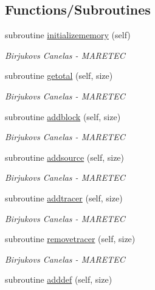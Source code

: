 \subsection*{Functions/\+Subroutines}
\begin{DoxyCompactItemize}
\item 
subroutine \hyperlink{namespacesimulation__memory__mod_ac8306165e4ec88fec9a2b8b719f61893}{initializememory} (self)
\begin{DoxyCompactList}\small\item\em Birjukovs Canelas -\/ M\+A\+R\+E\+T\+EC \end{DoxyCompactList}\item 
subroutine \hyperlink{namespacesimulation__memory__mod_acf04d6b930ed3ffbc0950afd86033c51}{getotal} (self, size)
\begin{DoxyCompactList}\small\item\em Birjukovs Canelas -\/ M\+A\+R\+E\+T\+EC \end{DoxyCompactList}\item 
subroutine \hyperlink{namespacesimulation__memory__mod_a4169689db37b3ba35e092096a7019f80}{addblock} (self, size)
\begin{DoxyCompactList}\small\item\em Birjukovs Canelas -\/ M\+A\+R\+E\+T\+EC \end{DoxyCompactList}\item 
subroutine \hyperlink{namespacesimulation__memory__mod_a940ff42fa3a49423f9ac98da2bffa54c}{addsource} (self, size)
\begin{DoxyCompactList}\small\item\em Birjukovs Canelas -\/ M\+A\+R\+E\+T\+EC \end{DoxyCompactList}\item 
subroutine \hyperlink{namespacesimulation__memory__mod_a5770021491589bbd61ea112d113a9c9d}{addtracer} (self, size)
\begin{DoxyCompactList}\small\item\em Birjukovs Canelas -\/ M\+A\+R\+E\+T\+EC \end{DoxyCompactList}\item 
subroutine \hyperlink{namespacesimulation__memory__mod_a5f95539e9740401e7046b79c40ad2ecd}{removetracer} (self, size)
\begin{DoxyCompactList}\small\item\em Birjukovs Canelas -\/ M\+A\+R\+E\+T\+EC \end{DoxyCompactList}\item 
subroutine \hyperlink{namespacesimulation__memory__mod_ac6d6853bc462947d24a8f6234d625138}{adddef} (self, size)

\end{DoxyCompactItemize}
